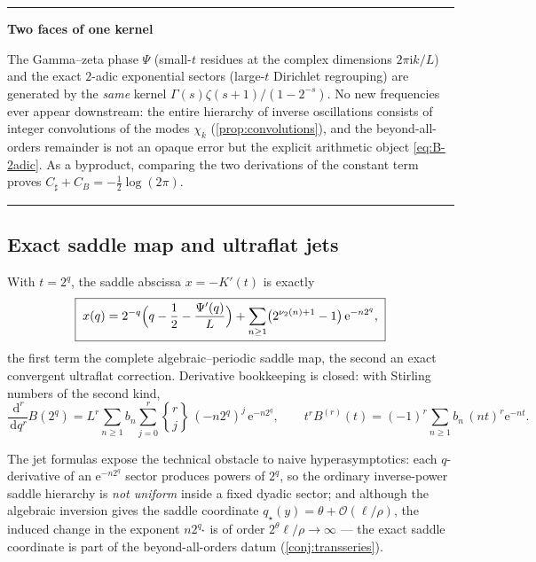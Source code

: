\documentclass[11pt,oneside]{article}
\numberwithin{equation}{section}
\theoremstyle{definition}
\theoremstyle{remark}
\newcommand{\dd}{\,\mathrm d}
\newcommand{\e}{\mathrm e}
\newcommand{\ii}{\mathrm i}
\newcommand{\bigO}{\mathcal O}
\newcommand{\vtwo}{\nu_2}
\newcommand{\Csharp}{C_{\sharp}}
\newcommand{\CB}{C_{B}}
\newenvironment{statusbox}[1]{%
  \par\smallskip\noindent\begin{center}\begin{minipage}{0.94\textwidth}%
  \hrule\vspace{0.5em}\noindent\textbf{#1}\par\smallskip
}{%
  \vspace{0.5em}\hrule\end{minipage}\end{center}\smallskip
}
\begin{document}
\begin{statusbox}{Two faces of one kernel}
The Gamma--zeta phase $\Psi$ (small-$t$ residues at the complex
dimensions $2\pi\ii k/L$) and the exact $2$-adic exponential sectors
(large-$t$ Dirichlet regrouping) are generated by the \emph{same}
kernel $\Gamma(s)\zeta(s+1)/(1-2^{-s})$.  No new frequencies ever
appear downstream: the entire hierarchy of inverse oscillations
consists of integer convolutions of the modes
$\chi_k$ (\cref{prop:convolutions}), and the beyond-all-orders
remainder is not an opaque error but the explicit arithmetic object
\eqref{eq:B-2adic}.  As a byproduct, comparing the two derivations
of the constant term proves $\Csharp+\CB=-\tfrac12\log(2\pi)$.
\end{statusbox}

\subsection{Exact saddle map and ultraflat jets}

\begin{corollary}
\label{cor:saddle-map}
With $t=2^{q}$, the saddle abscissa $x=-K'(t)$ is exactly
\begin{equation}
 \boxed{\;
 x(q)=2^{-q}\Bigl(q-\frac12-\frac{\Psi'(q)}{L}\Bigr)
 +\sum_{n\ge1}\bigl(2^{\vtwo(n)+1}-1\bigr)\,\e^{-n2^{q}},
 \;}
 \label{eq:saddle-map}
\end{equation}
the first term the complete algebraic--periodic saddle map, the
second an exact convergent ultraflat correction.  Derivative
bookkeeping is closed: with Stirling numbers of the second kind,
\begin{equation}
 \frac{\dd^{r}}{\dd q^{r}}B(2^{q})
 =L^{r}\sum_{n\ge1}b_n
 \sum_{j=0}^{r}
 \genfrac\{\}{0pt}{}{r}{j}\,(-n2^{q})^{j}\,\e^{-n2^{q}},
 \qquad
 t^{r}B^{(r)}(t)=(-1)^{r}\sum_{n\ge1}b_n\,(nt)^{r}\e^{-nt}.
 \label{eq:touchard-jets}
\end{equation}
\end{corollary}

The jet formulas expose the technical obstacle to naive
hyperasymptotics: each $q$-derivative of an
$\e^{-n2^{q}}$ sector produces powers of $2^{q}$, so the ordinary
inverse-power saddle hierarchy is \emph{not uniform} inside a fixed
dyadic sector; and although the algebraic inversion gives the saddle
coordinate $q_\star(y)=\theta+\bigO(\ell/\rho)$, the induced change
in the exponent $n2^{q_\star}$ is of order
$2^{\theta}\ell/\rho\to\infty$ --- the exact saddle coordinate is
part of the beyond-all-orders datum
(\cref{conj:transseries}).
\end{document}
